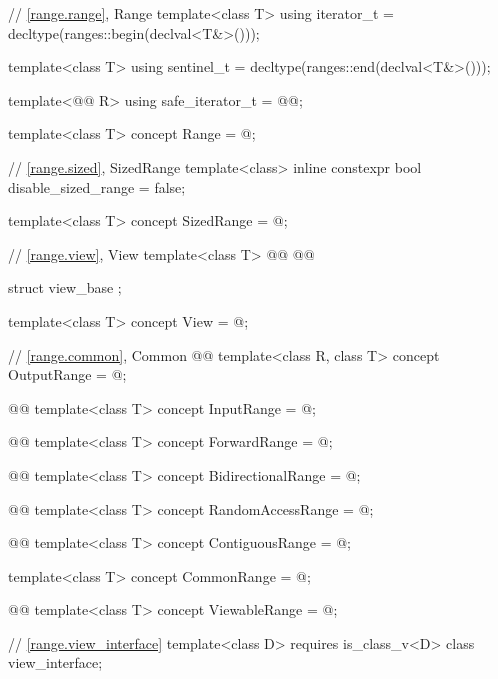 \begin{addedblock}
\begin{codeblock}
{  // \ref{range.range}, Range
  template<class T>
    using iterator_t = decltype(ranges::begin(declval<T&>()));

  template<class T>
    using sentinel_t = decltype(ranges::end(declval<T&>()));

  template<@@ R>
    using safe_iterator_t = @@;

  template<class T>
    concept Range = @\seebelownc@;

  // \ref{range.sized}, SizedRange
  template<class>
    inline constexpr bool disable_sized_range = false;

  template<class T>
    concept SizedRange = @\seebelownc@;

  // \ref{range.view}, View
  template<class T>
  @@
  @@

  struct view_base { };

  template<class T>
    concept View = @\seebelownc@;

  // \ref{range.common}, Common 
  @@
  template<class R, class T>
    concept OutputRange = @\seebelownc@;

  @@
  template<class T>
    concept InputRange = @\seebelownc@;

  @@
  template<class T>
    concept ForwardRange = @\seebelownc@;

  @@
  template<class T>
    concept BidirectionalRange = @\seebelownc@;

  @@
  template<class T>
    concept RandomAccessRange = @\seebelownc@;

  @@
  template<class T>
    concept ContiguousRange = @\seebelownc@;

  template<class T>
    concept CommonRange = @\seebelownc@;

  @@
  template<class T>
    concept ViewableRange = @\seebelownc@;

  // \ref{range.view_interface}
  template<class D>
    requires is_class_v<D>
  class view_interface;

}
\end{codeblock}
\end{addedblock}
